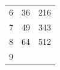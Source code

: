 {\begin{tabular}[t]{|l|l|l|}
        6 &
        36 &
        216%
     \tabularnewline\cline{1-1}\cline{2-2}\cline{3-3}
        7 &
        49 &
        343%
     \tabularnewline\cline{1-1}\cline{2-2}\cline{3-3}
        8 &
        64 &
        512%
     \tabularnewline\cline{1-1}\cline{2-2}\cline{3-3}
        9 &

\end{tabular}}

